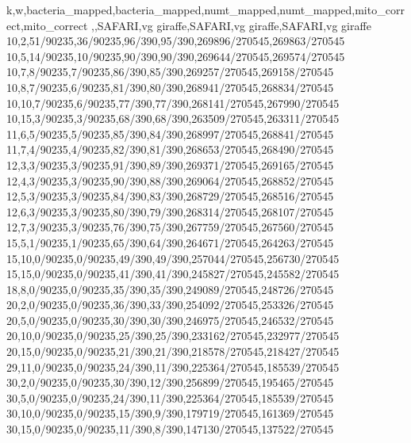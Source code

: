k,w,bacteria_mapped,bacteria_mapped,numt_mapped,numt_mapped,mito_correct,mito_correct
,,SAFARI,vg giraffe,SAFARI,vg giraffe,SAFARI,vg giraffe
10,2,51/90235,36/90235,96/390,95/390,269896/270545,269863/270545
10,5,14/90235,10/90235,90/390,90/390,269644/270545,269574/270545
10,7,8/90235,7/90235,86/390,85/390,269257/270545,269158/270545
10,8,7/90235,6/90235,81/390,80/390,268941/270545,268834/270545
10,10,7/90235,6/90235,77/390,77/390,268141/270545,267990/270545
10,15,3/90235,3/90235,68/390,68/390,263509/270545,263311/270545
11,6,5/90235,5/90235,85/390,84/390,268997/270545,268841/270545
11,7,4/90235,4/90235,82/390,81/390,268653/270545,268490/270545
12,3,3/90235,3/90235,91/390,89/390,269371/270545,269165/270545
12,4,3/90235,3/90235,90/390,88/390,269064/270545,268852/270545
12,5,3/90235,3/90235,84/390,83/390,268729/270545,268516/270545
12,6,3/90235,3/90235,80/390,79/390,268314/270545,268107/270545
12,7,3/90235,3/90235,76/390,75/390,267759/270545,267560/270545
15,5,1/90235,1/90235,65/390,64/390,264671/270545,264263/270545
15,10,0/90235,0/90235,49/390,49/390,257044/270545,256730/270545
15,15,0/90235,0/90235,41/390,41/390,245827/270545,245582/270545
18,8,0/90235,0/90235,35/390,35/390,249089/270545,248726/270545
20,2,0/90235,0/90235,36/390,33/390,254092/270545,253326/270545
20,5,0/90235,0/90235,30/390,30/390,246975/270545,246532/270545
20,10,0/90235,0/90235,25/390,25/390,233162/270545,232977/270545
20,15,0/90235,0/90235,21/390,21/390,218578/270545,218427/270545
29,11,0/90235,0/90235,24/390,11/390,225364/270545,185539/270545
30,2,0/90235,0/90235,30/390,12/390,256899/270545,195465/270545
30,5,0/90235,0/90235,24/390,11/390,225364/270545,185539/270545
30,10,0/90235,0/90235,15/390,9/390,179719/270545,161369/270545
30,15,0/90235,0/90235,11/390,8/390,147130/270545,137522/270545
